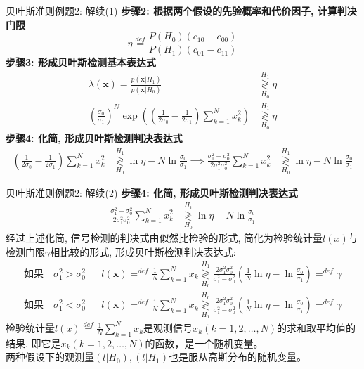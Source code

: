 \begin{frame}[shrink]{贝叶斯准则例题2: 解续(1)}
\textbf{步骤2: 根据两个假设的先验概率和代价因子, 计算判决门限}
\[\eta\mathop{=}\limits^{def}\frac{P(H_0)(c_{10}-c_{00})}{P(H_1)(c_{01}-c_{11})} \]
\textbf{步骤3: 形成贝叶斯检测基本表达式}
\begin{align*}
\lambda(\bm{x})=\frac{p(\bm{x}|H_1)}{p(\bm{x}|H_0)}&\mathop{\gtrless}\limits_{H_0}^{H_1}\eta\\
\left(\frac{\sigma_0}{\sigma_1}\right)^N\exp\left(\left(\frac{1}{2\sigma_0}-\frac{1}{2\sigma_1}\right)\sum\limits_{k=1}^{N}x_k^2\right)&\mathop{\gtrless}\limits_{H_0}^{H_1}\eta
\end{align*} 
\textbf{步骤4: 化简, 形成贝叶斯检测判决表达式}
\begin{align*}
\left(\frac{1}{2\sigma_0}-\frac{1}{2\sigma_1}\right)\sum\limits_{k=1}^{N}x_k^2&\mathop{\gtrless}\limits_{H_0}^{H_1}\ln\eta-N\ln\frac{\sigma_0}{\sigma_1}\implies 
\frac{\sigma_1^2-\sigma_0^2}{2\sigma_1^2\sigma_0^2}\sum\limits_{k=1}^{N}x_k^2&\mathop{\gtrless}\limits_{H_0}^{H_1}\ln\eta-N\ln\frac{\sigma_0}{\sigma_1}
\end{align*} 
\end{frame}

\begin{frame}[shrink]{贝叶斯准则例题2: 解续(2)}
\textbf{步骤4: 化简, 形成贝叶斯检测判决表达式}
\begin{align*}
\frac{\sigma_1^2-\sigma_0^2}{2\sigma_1^2\sigma_0^2}\sum\limits_{k=1}^{N}x_k^2&\mathop{\gtrless}\limits_{H_0}^{H_1}\ln\eta-N\ln\frac{\sigma_0}{\sigma_1}
\end{align*}
经过上述化简, 信号检测的判决式由似然比检验的形式, 简化为检验统计量$l(x)$与检测门限$\gamma$相比较的形式, 形成贝叶斯检测判决表达式:
\begin{align*}
\textbf{如果}\quad\sigma_1^2>\sigma_0^2 &&l(\bm{x})\mathop{=}^{def}\frac{1}{N}\sum\limits_{k=1}^{N}x_k\mathop{\gtrless}\limits_{H_0}^{H_1}\frac{2\sigma_1^2\sigma_0^2}{\sigma_1^2-\sigma_0^2}(\frac{1}{N}\ln\eta-\ln\frac{\sigma_0}{\sigma_1})\mathop{=}^{def}\gamma\\
\textbf{如果}\quad\sigma_1^2<\sigma_0^2 &&l(\bm{x})\mathop{=}^{def}\frac{1}{N}\sum\limits_{k=1}^{N}x_k\mathop{\gtrless}\limits_{H_1}^{H_0}\frac{2\sigma_1^2\sigma_0^2}{\sigma_1^2-\sigma_0^2}(\frac{1}{N}\ln\eta-\ln\frac{\sigma_0}{\sigma_1})\mathop{=}^{def}\gamma
\end{align*}
检验统计量$l(x)\mathop{=}\limits^{def}\frac{1}{N}\sum\limits_{k=1}^Nx_k$是观测信号$x_k(k=1,2,\dots,N)$的求和取平均值的结果, 即它是$x_k(k=1,2,\dots,N)$的函数，是一个随机变量。\\
两种假设下的观测量$(l|H_0),(l|H_1)$也是服从高斯分布的随机变量。 
\end{frame}

